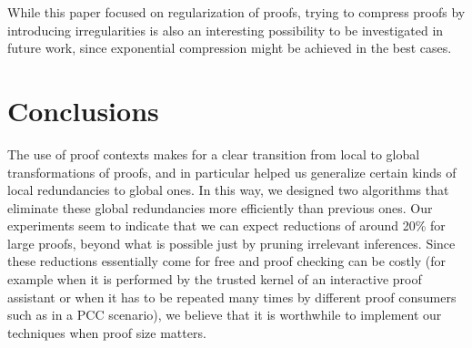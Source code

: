 \documentclass[envcountsame]{llncs}
\begin{document}
While this paper focused on regularization of proofs, trying to compress proofs by introducing 
irregularities is also an interesting possibility to be investigated in future work, 
since exponential compression might be achieved in the best cases.


\section{Conclusions}

The use of proof contexts makes for a clear transition from local to global
transformations of proofs, and in particular helped us generalize certain kinds
of local redundancies to global ones. In this way, we designed two algorithms
that eliminate these global redundancies more efficiently than previous ones.
Our experiments seem to indicate that we can expect reductions of around 20\%
for large proofs, beyond what is possible just by pruning irrelevant inferences.
Since these reductions essentially come for free and proof checking can be
costly (for example when it is performed by the trusted kernel of an interactive
proof assistant or when it has to be repeated many times by different proof
consumers such as in a PCC scenario), we believe that it is
worthwhile to implement our techniques when proof size matters.



\end{document}
